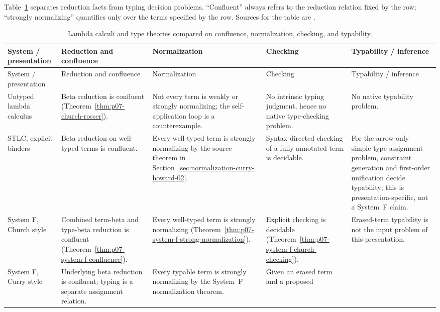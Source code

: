 Table~\ref{tab:p07-lambda-calculi-comparison} separates reduction facts from
typing decision problems.  ``Confluent'' always refers to the reduction
relation fixed by the row; ``strongly normalizing'' quantifies only over the
terms specified by the row.  Sources for the table are
\cite{Barendregt1984,GirardLafontTaylor1989,Girard1972,Wells1999,
AbelCoquandDybjer2007}.

\begin{landscape}
\begingroup\scriptsize
\setlength{\tabcolsep}{3pt}
\begin{longtable}{@{}p{.95in}p{1.30in}p{1.45in}p{1.55in}p{1.55in}@{}}
\caption{Lambda calculi and type theories compared on confluence,
normalization, checking, and typability.}
\label{tab:p07-lambda-calculi-comparison}\\
\toprule
System / presentation & Reduction and confluence & Normalization & Checking &
Typability / inference \\
\midrule
\endfirsthead
\toprule
System / presentation & Reduction and confluence & Normalization & Checking &
Typability / inference \\
\midrule
\endhead
Untyped lambda calculus & Beta reduction is confluent
(Theorem~\ref{thm:p07-church-rosser}). & Not every term is weakly or strongly
normalizing; the self-application loop is a counterexample. & No intrinsic
typing judgment, hence no native type-checking problem. & No native
typability problem. \\
STLC, explicit binders & Beta reduction on well-typed terms is confluent. &
Every well-typed term is strongly normalizing by the source theorem in
Section~\ref{sec:normalization-curry-howard-02}. & Syntax-directed checking
of a fully annotated term is decidable. & For the arrow-only simple-type
assignment problem, constraint generation and first-order unification decide
typability; this is presentation-specific, not a System~F claim. \\
System F, Church style & Combined term-beta and type-beta reduction is
confluent (Theorem~\ref{thm:p07-system-f-confluence}). & Every well-typed term
is strongly normalizing
(Theorem~\ref{thm:p07-system-f-strong-normalization}). & Explicit checking is
decidable (Theorem~\ref{thm:p07-system-f-church-checking}). & Erased-term
typability is not the input problem of this presentation. \\
System F, Curry style & Underlying beta reduction is confluent; typing is a
separate assignment relation. & Every typable term is strongly normalizing by
the System~F normalization theorem. & Given an erased term and a proposed

\end{longtable}
\end{landscape}
